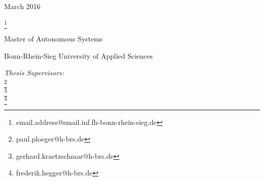 \begin{titlepage}
\centering
\vspace*{1in}
\begin{LARGE}\bfseries
\PaperSubject \par
\end{LARGE}
\PaperTitle\par
\vspace{0.5in}
March 2016\\
\vspace{1.5in}
\begin{Large}
\href{\PaperMainWriterEMail}{\PaperMainWriter \footnote{\href{\PaperMainWriterEMail} {email.address@smail.inf.fh-bonn-rhein-sieg.de}} 
} \par
\end{Large}
\vfill
\vspace{0.5in}
Master of Autonomous Systems
\par
Bonn-Rhein-Sieg University of Applied Sciences
\par
\vspace{0.5in}
\par
\emph{Thesis Supervisors:}\\
\href{\PaperLecturerEMail}{\PaperLecturer \footnote{\href{\PaperLecturerEMail} {paul.ploeger@h-brs.de}}}\\
\href{\SecondSupervisorEMail}{\SecondSupervisor \footnote{\href{\SecondSupervisorEMail} {gerhard.kraetzschmar@h-brs.de}}}\\
\href{\ThirdSupervisorEMail}{\ThirdSupervisor \footnote{\href{\ThirdSupervisorEMail} {frederik.hegger@h-brs.de}}}
\vfill
\end{titlepage}
